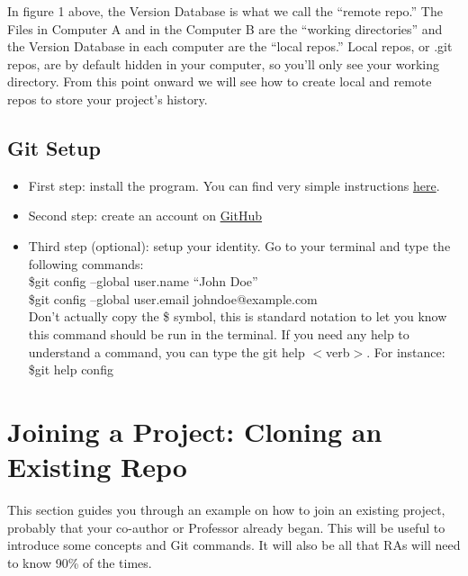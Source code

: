 \documentclass{article}
\begin{document}
	In figure 1 above, the Version Database is what we call the ``remote repo.'' The Files in Computer A and in the Computer B are the ``working directories'' and the Version Database in each computer are the ``local repos.'' Local repos, or .git repos, are by default hidden in your computer, so you'll only see your working directory. From this point onward we will see how to create local and remote repos to store your project's history.


\subsection{Git Setup}
    \begin{itemize}
        \item First step: install the program. You can find very simple instructions \href{https://git-scm.com/book/en/v2/Getting-Started-Installing-Git}{here}. 
        \item Second step: create an account on \href{https://github.com}{GitHub}
        \item Third step (optional): setup your identity. Go to your terminal and type the following commands: \\
        \newline
        \indent \$git config --global user.name ``John Doe'' \\
        \newline
        \indent \$git config --global user.email johndoe@example.com \\
        \newline
        Don't actually copy the \$ symbol, this is standard notation to let you know this command should be run in the terminal. If you need any help to understand a command, you can type the git help $<$verb$>$. For instance: \\
        \newline
        \indent \$git help config
    \end{itemize}

\section{Joining a Project: Cloning an Existing Repo}

    This section guides you through an example on how to join an existing project, probably that your co-author or Professor already began. This will be useful to introduce some concepts and Git commands. It will also be all that RAs will need to know 90\% of the times.
    
\end{document}
